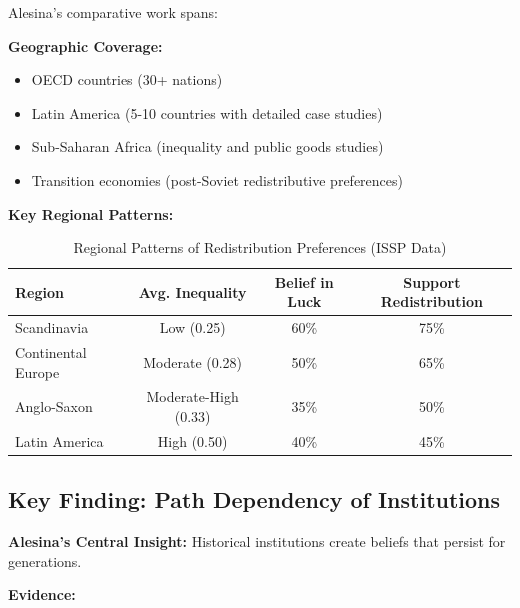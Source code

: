 Alesina's comparative work spans:

\textbf{Geographic Coverage:}
\begin{itemize}
\item OECD countries (30+ nations)
\item Latin America (5-10 countries with detailed case studies)
\item Sub-Saharan Africa (inequality and public goods studies)
\item Transition economies (post-Soviet redistributive preferences)
\end{itemize}

\textbf{Key Regional Patterns:}

\begin{table}[h]
\centering
\caption{Regional Patterns of Redistribution Preferences (ISSP Data)}
\label{tab:alesina-regional}
\begin{tabular}{lccc}
\toprule
\textbf{Region} & \textbf{Avg. Inequality} & \textbf{Belief in Luck} & \textbf{Support Redistribution} \\
\midrule
Scandinavia & Low (0.25) & 60\% & 75\% \\
Continental Europe & Moderate (0.28) & 50\% & 65\% \\
Anglo-Saxon & Moderate-High (0.33) & 35\% & 50\% \\
Latin America & High (0.50) & 40\% & 45\% \\
\bottomrule
\end{tabular}
\end{table}

\subsection{Key Finding: Path Dependency of Institutions}

\textbf{Alesina's Central Insight:} Historical institutions create beliefs that persist for generations.

\textbf{Evidence:}


